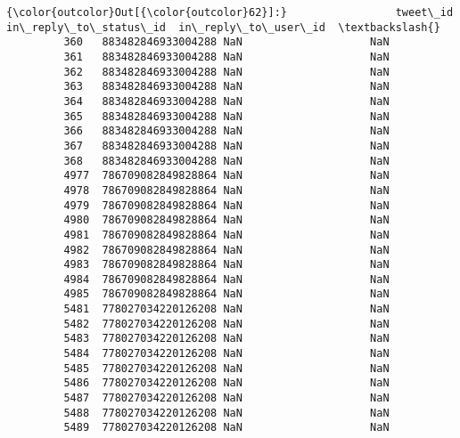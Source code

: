 \documentclass[11pt]{article}
\begin{document}
\begin{Verbatim}[commandchars=\\\{\}]
{\color{outcolor}Out[{\color{outcolor}62}]:}                 tweet\_id  in\_reply\_to\_status\_id  in\_reply\_to\_user\_id  \textbackslash{}
         360   883482846933004288 NaN                    NaN                    
         361   883482846933004288 NaN                    NaN                    
         362   883482846933004288 NaN                    NaN                    
         363   883482846933004288 NaN                    NaN                    
         364   883482846933004288 NaN                    NaN                    
         365   883482846933004288 NaN                    NaN                    
         366   883482846933004288 NaN                    NaN                    
         367   883482846933004288 NaN                    NaN                    
         368   883482846933004288 NaN                    NaN                    
         4977  786709082849828864 NaN                    NaN                    
         4978  786709082849828864 NaN                    NaN                    
         4979  786709082849828864 NaN                    NaN                    
         4980  786709082849828864 NaN                    NaN                    
         4981  786709082849828864 NaN                    NaN                    
         4982  786709082849828864 NaN                    NaN                    
         4983  786709082849828864 NaN                    NaN                    
         4984  786709082849828864 NaN                    NaN                    
         4985  786709082849828864 NaN                    NaN                    
         5481  778027034220126208 NaN                    NaN                    
         5482  778027034220126208 NaN                    NaN                    
         5483  778027034220126208 NaN                    NaN                    
         5484  778027034220126208 NaN                    NaN                    
         5485  778027034220126208 NaN                    NaN                    
         5486  778027034220126208 NaN                    NaN                    
         5487  778027034220126208 NaN                    NaN                    
         5488  778027034220126208 NaN                    NaN                    
         5489  778027034220126208 NaN                    NaN                    
         

\end{Verbatim}
\end{document}
